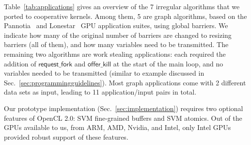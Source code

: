 \documentclass[sigconf]{acmart}
\newcommand{\TSAdded}[1]{#1}
\newcommand{\mytablong}{Table~}
\newcommand{\mysec}{Sec.~}
\newcommand{\nvidia}{Nvidia\xspace}
\newcommand{\offerfork}{\mathsf{request\_fork}}
\newcommand{\offerkill}{\mathsf{offer\_kill}}
\begin{document}
{\begin{table}[t]
\label{tab:applications}
\end{table}


\mytablong\ref{tab:applications} gives an overview of the 7 irregular
algorithms that we ported to cooperative kernels. Among them, 5 are
graph algorithms, based on the Pannotia~\cite{Pannotia} and
Lonestar~\cite{BNP12} GPU application suites, using global barriers.
We indicate how many of the original number of barriers are changed to
resizing barriers (all of them), and how many variables need to be
transmitted.  The remaining two algorithms are work stealing
applications: each required the addition of $\offerfork$ and
$\offerkill$ at the start of the main loop, and no variables needed to
be transmitted (similar to example discussed in \mysec\ref{sec:programmingguidelines}).
Most graph applications come with 2 different data sets as input,
leading to 11 application/input pairs in total.


\TSAdded{Our prototype implementation (\mysec\ref{sec:implementation}) requires
two optional features of OpenCL 2.0: SVM fine-grained buffers and SVM
atomics. Out of the GPUs available to us, from ARM, AMD, \nvidia, and
Intel, only Intel GPUs provided robust support of these features.}


}
\end{document}
